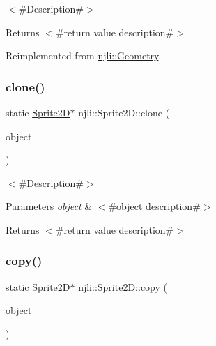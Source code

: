 $<$\#\+Description\#$>$

\begin{DoxyReturn}{Returns}
$<$\#return value description\#$>$ 
\end{DoxyReturn}


Reimplemented from \mbox{\hyperlink{classnjli_1_1_geometry_a8a14d6d068bf303718c1a92886f673b8}{njli\+::\+Geometry}}.

\mbox{\label{classnjli_1_1_sprite2_d_a74e12714eebdca602203dc3f1570c307}} 
\subsubsection{\texorpdfstring{clone()}{clone()}}
{\footnotesize\ttfamily static \mbox{\hyperlink{classnjli_1_1_sprite2_d}{Sprite2D}}$\ast$ njli\+::\+Sprite2\+D\+::clone (\begin{DoxyParamCaption}\item[{const \mbox{\hyperlink{classnjli_1_1_sprite2_d}{Sprite2D}} \&}]{object }\end{DoxyParamCaption})\hspace{0.3cm}{\ttfamily [static]}}

$<$\#\+Description\#$>$


\begin{DoxyParams}{Parameters}
{\em object} & $<$\#object description\#$>$\\
\hline
\end{DoxyParams}
\begin{DoxyReturn}{Returns}
$<$\#return value description\#$>$ 
\end{DoxyReturn}
\mbox{\label{classnjli_1_1_sprite2_d_a8a4d39bc4949de3339c0cc9adb584a12}} 
\subsubsection{\texorpdfstring{copy()}{copy()}}
{\footnotesize\ttfamily static \mbox{\hyperlink{classnjli_1_1_sprite2_d}{Sprite2D}}$\ast$ njli\+::\+Sprite2\+D\+::copy (\begin{DoxyParamCaption}\item[{const \mbox{\hyperlink{classnjli_1_1_sprite2_d}{Sprite2D}} \&}]{object }\end{DoxyParamCaption})\hspace{0.3cm}{\ttfamily [static]}}

